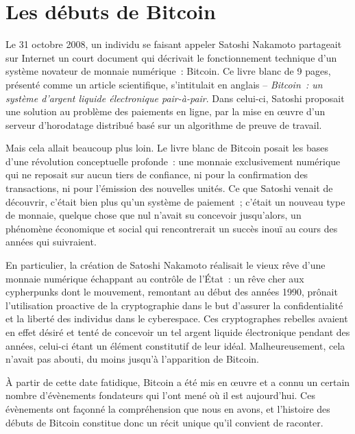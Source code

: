 
\chapter{Les débuts de Bitcoin}
\label{ch:mythe}


Le 31 octobre 2008, un individu se faisant appeler Satoshi Nakamoto partageait sur Internet un court document qui décrivait le fonctionnement technique d'un système novateur de monnaie numérique~: Bitcoin. Ce livre blanc de 9 pages, présenté comme un article scientifique, s'intitulait en anglais  -- \emph{Bitcoin~: un système d'argent liquide électronique pair-à-pair}. Dans celui-ci, Satoshi proposait une solution au problème des paiements en ligne, par la mise en œuvre d'un serveur d'horodatage distribué basé sur un algorithme de preuve de travail.

Mais cela allait beaucoup plus loin. Le livre blanc de Bitcoin posait les bases d'une révolution conceptuelle profonde~: une monnaie exclusivement numérique qui ne reposait sur aucun tiers de confiance, ni pour la confirmation des transactions, ni pour l'émission des nouvelles unités. Ce que Satoshi venait de découvrir, c'était bien plus qu'un système de paiement~; c'était un nouveau type de monnaie, quelque chose que nul n'avait su concevoir jusqu'alors, un phénomène économique et social qui rencontrerait un succès inouï au cours des années qui suivraient.

En particulier, la création de Satoshi Nakamoto réalisait le vieux rêve d'une monnaie numérique échappant au contrôle de l'État~: un rêve cher aux cypherpunks dont le mouvement, remontant au début des années 1990, prônait l'utilisation proactive de la cryptographie dans le but d'assurer la confidentialité et la liberté des individus dans le cyberespace. Ces cryptographes rebelles avaient en effet désiré et tenté de concevoir un tel argent liquide électronique pendant des années, celui-ci étant un élément constitutif de leur idéal. Malheureusement, cela n'avait pas abouti, du moins jusqu'à l'apparition de Bitcoin.

À partir de cette date fatidique, Bitcoin a été mis en œuvre et a connu un certain nombre d'évènements fondateurs qui l'ont mené où il est aujourd'hui. Ces évènements ont façonné la compréhension que nous en avons, et l'histoire des débuts de Bitcoin constitue donc un récit unique qu'il convient de raconter.

